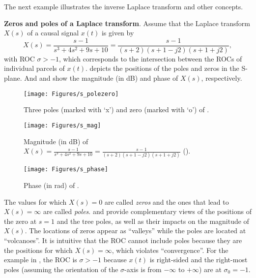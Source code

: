 The next example illustrates the inverse Laplace transform and other concepts.

\bExample \textbf{Zeros and poles of a Laplace transform}.
Assume that the Laplace transform $X(s)$ of a causal signal $x(t)$ is given by
\begin{equation}
X(s) =  \frac{s-1}{s^3+4s^2+9s+10} = \frac{s-1}{(s+2)(s+1-j2)(s+1+j2)},
\label{eq:laplace_example}
\end{equation}
with ROC $\sigma > -1$, which corresponds to the intersection between the ROCs of individual parcels of $x(t)$.
 depicts the positions of the poles and zeros in the S-plane. And  and  show the magnitude (in dB) and phase of $X(s)$, respectively.

\begin{figure}[!htb]
        \centering
                \texttt{[image: Figures/s\_polezero]}
        \caption{Three poles (marked with `x') and zero (marked with `o') of .\label{fig:s_polezero}}
\end{figure}


\begin{figure}[!htb]
        \centering
                \texttt{[image: Figures/s\_mag]}               
        \caption{Magnitude (in dB) of $X(s) =  \frac{s-1}{s^3+4s^2+9s+10} = \frac{s-1}{(s+2)(s+1-j2)(s+1+j2)}$ ().\label{fig:s_mag}}
\end{figure}

\begin{figure}[!htb]
        \centering
                \texttt{[image: Figures/s\_phase]}             
        \caption{Phase (in rad) of .\label{fig:s_phase}}
\end{figure}

The values for which $X(s)=0$ are called \emph{zeros} and the ones that lead to $X(s)=\infty$ are called \emph{poles}.
 and  provide complementary views of the positions of the zero at $s=1$ and the tree poles, as well as their impacts on the magnitude of $X(s)$. The locations of zeros appear as ``valleys'' while the poles are located at ``volcanoes''. It is intuitive that the ROC cannot include poles because they are the positions for which $X(s)=\infty$, which violates ``convergence''. For the example in , the ROC is $\sigma > -1$ because $x(t)$ is right-sided and the right-most poles (assuming the orientation of the $\sigma$-axis is from $-\infty$ to $+\infty$) are at $\sigma_0 = -1$.

